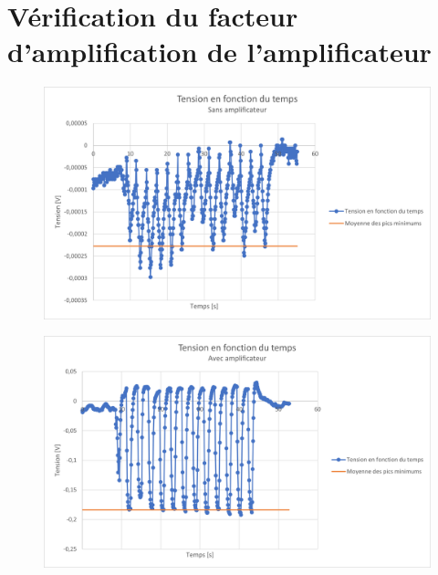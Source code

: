 \documentclass[
    iai & comatec, %
    mi, %
]{heig-tb}
\begin{document}
\section{Vérification du facteur d'amplification de l'amplificateur}
\begin{figure}[H]
    \hspace{-1cm}
    \includegraphics[scale = 0.8]{assets/figures/Facteur_ampli1.png}
\end{figure}
\begin{figure}[H]
    \hspace{-1cm}
    \includegraphics[scale = 0.8]{assets/figures/Facteur_ampli2.png}
\end{figure}
\end{document}
